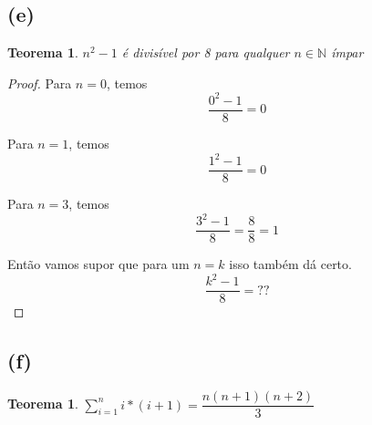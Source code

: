 \documentclass{article}
\begin{document}
\subsection*{(e)}
\newtheorem{teo5}{Teorema}
\begin{teo5}
	$n^2 - 1$ é divisível por 8 para qualquer $n \in \mathbb{N}$ ímpar
\end{teo5}

\begin{proof}
	Para $n = 0$, temos
	\begin{equation}
		\dfrac{0^2 - 1}{8} = 0
	\end{equation}

	Para $n = 1$, temos
	\begin{equation}
		\dfrac{1^2 - 1}{8} = 0
	\end{equation}

	Para $n = 3$, temos
	\begin{equation}
		\dfrac{3^2 - 1}{8} = \dfrac{8}{8} = 1
	\end{equation}

	Então vamos supor que para um $n = k$ isso também dá certo.
	\begin{equation}
		\dfrac{k^2 - 1}{8} = ??
	\end{equation}
\end{proof}

\subsection*{(f)}
\newtheorem{teo6}{Teorema}
\begin{teo6}
	$\sum\limits_{i = 1}^{n}i * (i+1) = \dfrac{n(n + 1)(n + 2)}{3} $
\end{teo6}
\end{document}
